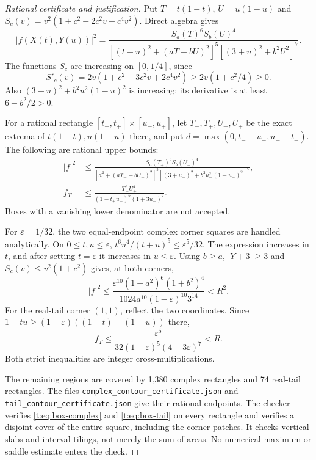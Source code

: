 \documentclass[11pt]{amsart}
\theoremstyle{plain}
\theoremstyle{remark}\newtheorem{remark}[theorem]{Remark}
\numberwithin{equation}{section}
\begin{document}
\begin{proof}[Rational certificate and justification]
Put $T=t(1-t)$, $U=u(1-u)$ and
$S_c(v)=v^2(1+c^2-2c^2v+c^4v^2)$. Direct algebra gives
\begin{equation}\label{t:eq:modulus}
 |f(X(t),Y(u))|^2
 =\frac{S_a(T)^6S_b(U)^4}
 {[(t-u)^2+(aT+bU)^2]^5[(3+u)^2+b^2U^2]^7}.
\end{equation}
The functions $S_c$ are increasing on $[0,1/4]$, since
\[
 S'_c(v)=2v(1+c^2-3c^2v+2c^4v^2)
 \ge2v(1+c^2/4)\ge0.
\]
Also $(3+u)^2+b^2u^2(1-u)^2$ is increasing: its derivative is at least
$6-b^2/2>0$.

For a rational rectangle $[t_-,t_+]\times[u_-,u_+]$, let
$T_-,T_+,U_-,U_+$ be the exact extrema of $t(1-t),u(1-u)$ there, and put
$d=\max(0,t_--u_+,u_--t_+)$. The following are rational upper bounds:
\begin{align}
 |f|^2&\le
 \frac{S_a(T_+)^6S_b(U_+)^4}
 {[d^2+(aT_-+bU_-)^2]^5
  [(3+u_-)^2+b^2u_-^2(1-u_-)^2]^7},\label{t:eq:box-complex}\\
 f_T&\le
 \frac{T_+^6U_+^4}{(1-t_+u_+)^5(1+3u_-)^7}.
 \label{t:eq:box-tail}
\end{align}
Boxes with a vanishing lower denominator are not accepted.

For $\varepsilon=1/32$, the two equal-endpoint complex corner squares
are handled analytically. On $0\le t,u\le\varepsilon$,
$t^6u^4/(t+u)^5\le\varepsilon^5/32$. The expression increases in $t$,
and after setting $t=\varepsilon$ it increases in $u\le\varepsilon$.
Using $b\ge a$, $|Y+3|\ge3$ and $S_c(v)\le v^2(1+c^2)$ gives, at
both corners,
\begin{equation}\label{t:eq:corner-C}
 |f|^2\le
 \frac{\varepsilon^{10}(1+a^2)^6(1+b^2)^4}
 {1024a^{10}(1-\varepsilon)^{10}3^{14}}<R^2.
\end{equation}
For the real-tail corner $(1,1)$, reflect the two coordinates. Since
$1-tu\ge(1-\varepsilon)((1-t)+(1-u))$ there,
\begin{equation}\label{t:eq:corner-T}
 f_T\le
 \frac{\varepsilon^5}{32(1-\varepsilon)^5(4-3\varepsilon)^7}<R.
\end{equation}
Both strict inequalities are integer cross-multiplications.

The remaining regions are covered by 1,380 complex rectangles and 74
real-tail rectangles. The files \texttt{complex\_contour\_certificate.json}
and \texttt{tail\_contour\_certificate.json} give their rational endpoints.
The checker verifies \eqref{t:eq:box-complex} and \eqref{t:eq:box-tail} on every
rectangle and verifies a disjoint cover of the entire square, including the
corner patches. It checks vertical slabs and interval tilings, not merely
the sum of areas. No numerical maximum or saddle estimate enters the check.
\end{proof}
\end{document}
